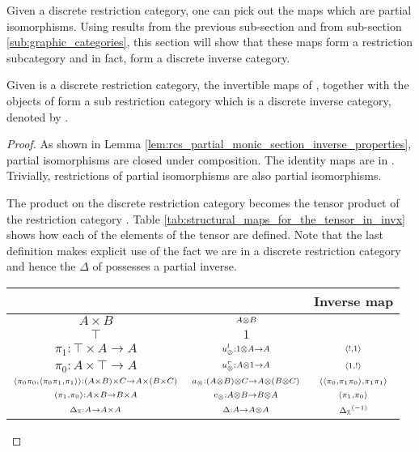 Given a discrete restriction category, one can pick out the maps which are partial isomorphisms.
Using results from the previous sub-section and from sub-section \vref{sub:graphic_categories},
this section will show that these maps form a restriction subcategory and in fact, form a discrete
inverse category.

\begin{lemma}\label{lem:inv_x_is_a_discrete_inverse_category}
  Given \X is a discrete restriction category, the invertible maps of \X, together with the objects
  of \X form a sub restriction category which is a discrete inverse category, denoted by \Invc{\X}.
\end{lemma}
\begin{proof}
  As shown in Lemma \vref{lem:rcs_partial_monic_section_inverse_properties}, partial isomorphisms
  are closed under composition. The identity maps are in \Invc{\X}. Trivially, restrictions of
  partial isomorphisms are also partial isomorphisms.

  The product on the discrete restriction category \X becomes the tensor product of the restriction
  category \Invc{\X}. Table \vref{tab:structural_maps_for_the_tensor_in_invx} shows how each of the
  elements of the tensor are defined. Note that the last definition makes explicit use of the fact
  we are in a discrete restriction category and hence the $\Delta$ of \X possesses a partial
  inverse.

  \begin{table}[h!]
    \begin{center}
      \begin{tabular}{|ccc|}
        \hline
        \X & \Invc{\X} & Inverse map\\
        \hline\hline
        $\scriptstyle A\times B$ & $\scriptstyle A\otimes B$ &\\
        \hline
        $\scriptstyle \top$ & $\scriptstyle 1$ &\\
        \hline
        $\scriptstyle \pi_1:\top\times A \to A$ & $\scriptstyle u_{\otimes}^l:1\otimes A \to A$ & $\scriptstyle \langle!,1\rangle$\\
        \hline
        $\scriptstyle \pi_0:A\times\top \to A$ & $\scriptstyle u_{\otimes}^r:A\otimes1 \to A$& $\scriptstyle \langle1,!\rangle$\\
        \hline
        ${\scriptstyle \langle\pi_0 \pi_0,\langle\pi_0 \pi_1,\pi_1\rangle\rangle:(A\times B)\times C \to A\times(B\times C)}$
          & $\scriptstyle a_{\otimes}:(A\otimes B)\otimes C \to A\otimes(B\otimes C)$
          & $\scriptstyle \langle\langle\pi_0, \pi_1 \pi_0\rangle,\pi_1 \pi_1\rangle$\\
        \hline
        $\scriptstyle \langle \pi_1,\pi_0\rangle:A\times B \to B\times A$ & $\scriptstyle c_{\otimes}:A\otimes B \to B \otimes A$ & $\scriptstyle \langle \pi_1,\pi_0\rangle$\\
        \hline
        $\scriptstyle \Delta_{\mathbb{X}}:A\to A\times A$ & $\scriptstyle \Delta:A \to A\otimes A$ & $\scriptstyle  {\Delta_{\ensuremath{\mathbb{X}}}}^{(-1)} $\\
        \hline
      \end{tabular}


\end{center}
\end{table}
\end{proof}
